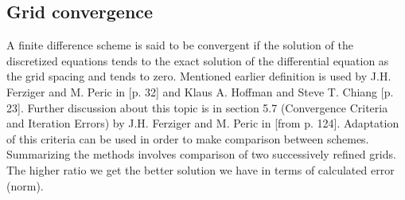 \subsection{Grid convergence}
	A finite difference scheme is said to be convergent if the solution of the discretized equations tends to the exact solution of the differential equation as the grid spacing and tends to zero. Mentioned earlier definition is used by J.H. Ferziger and M. Peric in \cite{bib:ferzinger}[p. 32] and Klaus A. Hoffman and Steve T. Chiang \cite{bib:hoffman}[p. 23]. Further discussion about this topic is in section 5.7 (Convergence Criteria and Iteration Errors) by J.H. Ferziger and M. Peric in \cite{bib:ferzinger}[from p. 124]. Adaptation of this criteria can be used in order to make comparison between schemes. Summarizing the methods involves comparison of two successively refined grids. The higher ratio we get the better solution we have in terms of calculated error (norm).
	
